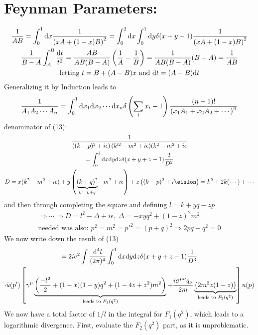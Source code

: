 \documentclass[]{scrartcl}
\begin{document}
\section{Feynman Parameters: }

\begin{gather}
\frac{1}{AB} = \int_0^1 \text dx \frac{1}{\left(xA + (1-x)B\right)^2} = \int_0^2\text dx\int_0^1 \text dy \delta(x+y-1) \frac{1}{\left(xA + (1-x)B\right)^2}\\
	\frac{1}{B-A}\int_A^B \frac{\text dt}{t^2} = \frac{AB}{AB(B-A)}\left(\frac{1}{A}-\frac{1}{B}\right) = \frac{1}{AB(B-A)}(B-A) = \frac{1}{AB}\\
	\text{letting $t = B + (A-B)x$ and d$t = (A-B)$d$t$}
\end{gather}
Generalizing it by Induction leads to
\begin{gather}
	\frac{1}{A_1A_2\cdots A_n} = \int_0^1 \text dx_1 \text dx_2 \cdots \text dx_n \delta\left(\sum_i x_i - 1\right) \frac{(n-1)!}{\left(x_1A_1 + x_2A_2 + \cdots\right)^n}
\end{gather}
denominator of (13):
\begin{gather}
	\frac{1}{\left((k-p)^2 + i\epsilon\right)(k'^2 - m^2 + i\epsilon)(k^2 - m^2 + i\epsilon}\\ = \int_0^1 \text dx \text dy \text dz \delta(x+y+z-1) \frac{2}{D^3}\\ D = x(k^2 - m^2 + i\epsilon) + y\left(\underbrace{(k+q)^2}_{k'=k+q} - m^2 +i\epsilon\right) + z\left((k-p)^2 + i\eislon\right) = k^2 + 2k(\cdots) + \cdots
\end{gather}
and then through completing the square and defining $l = k + yq - zp$
\begin{gather}
	\Rightarrow\cdots\Rightarrow D = l^2 - \Delta + i\epsilon,\; \Delta = -xyq^2 + (1-z)^2m^2\\
	\text{needed was also: } p^2 = m^2 = p'^2 = (p+q)^2 \Rightarrow 2pq + q^2 = 0
\end{gather}
We now write down the result of (13)
\begin{gather}
	= 2ie^2 \int\frac{\text d^4l}{(2\pi)^4}\int_0^1 \text dx\text dy\text dz \delta(x+y+z-1)\frac{1}{D^3}\\ \cdot\bar u(p') \left[\gamma^\mu \underbrace{\left(\frac{-l^2}{2} + (1-x)(1-y)q^2 + (1-4z+z^2)m^2\right)}_{\text{leads to }F_1(q^2)} + \frac{i\sigma^{\mu\nu}q_\nu}{2m}\underbrace{\left(2m^2z(1-z)\right)}_{\text{leads to }F_2(q^2)}\right]u(p)
\end{gather}
We now have a total factor of $1/l$ in the integral for $F_1(q^2)$, which leads to a logarithmic divergence. First, evaluate the $F_2(q^2)$ part, as it is unproblematic.
\end{document}
